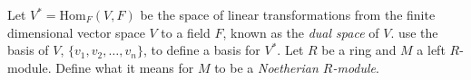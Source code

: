 \documentclass{exam}
\newcommand{\homgroup}[3]{\text{Hom}_{#1}(#2, #3)}
\begin{document}
\begin{center}
\end{center}
\vspace*{1em}
\begin{questions}
    \question[3]
        Let $V^* =\homgroup{F}{V}{F}$ be the space of linear transformations from the finite dimensional vector space $V$ to a field $F$, known 
        as the \textit{dual space} of $V$. use the basis of $V$, $\{v_1, v_2, \dots, v_n\}$, to define a basis for $V^*$.
    \vspace*{10cm}
    \question[2]
        Let $R$ be a ring and $M$ a left $R$-module. Define what it means for $M$ to be a \textit{Noetherian $R$-module}.
\end{questions}
\end{document}
